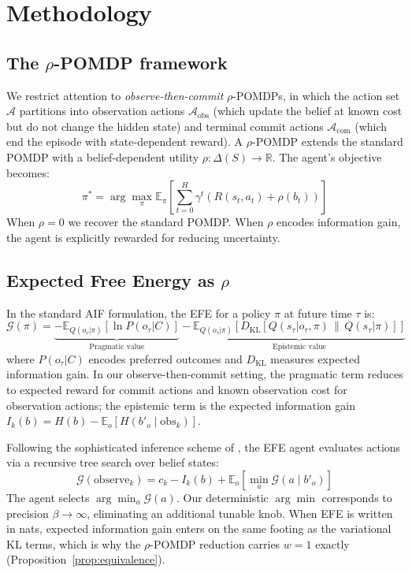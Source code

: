 \documentclass[runningheads]{llncs}
\begin{document}
\section{Methodology}
\label{sec:methodology}

\subsection{The $\rho$-POMDP framework}

We restrict attention to \emph{observe-then-commit} $\rho$-POMDPs, in which the action set $\mathcal{A}$ partitions into observation actions $\mathcal{A}_\text{obs}$ (which update the belief at known cost but do not change the hidden state) and terminal commit actions $\mathcal{A}_\text{com}$ (which end the episode with state-dependent reward). A $\rho$-POMDP extends the standard POMDP with a belief-dependent utility $\rho : \Delta(S) \rightarrow \mathbb{R}$. The agent's objective becomes:
\begin{equation}
    \pi^* = \arg\max_\pi \mathbb{E}_\pi \left[ \sum_{t=0}^{H} \gamma^t \left( R(s_t, a_t) + \rho(b_t) \right) \right]
\end{equation}
When $\rho = 0$ we recover the standard POMDP. When $\rho$ encodes information gain, the agent is explicitly rewarded for reducing uncertainty.

\subsection{Expected Free Energy as $\rho$}

In the standard AIF formulation, the EFE for a policy $\pi$ at future time $\tau$ is:
\begin{equation}
    \mathcal{G}(\pi) = \underbrace{- \mathbb{E}_{Q(o_\tau|\pi)}[\ln P(o_\tau|C)]}_{\text{Pragmatic value}} - \underbrace{\mathbb{E}_{Q(o_\tau|\pi)}\left[D_{\mathrm{KL}}\left[Q(s_\tau|o_\tau, \pi) \,\|\, Q(s_\tau|\pi)\right]\right]}_{\text{Epistemic value}}
\end{equation}
where $P(o_\tau|C)$ encodes preferred outcomes and $D_{\mathrm{KL}}$ measures expected information gain. In our observe-then-commit setting, the pragmatic term reduces to expected reward for commit actions and known observation cost for observation actions; the epistemic term is the expected information gain $I_k(b) = H(b) - \mathbb{E}_o[H(b'_o \mid \text{obs}_k)]$.

Following the sophisticated inference scheme of \citet{friston2021}, the EFE agent evaluates actions via a recursive tree search over belief states:
\begin{equation}
    \mathcal{G}(\text{observe}_k) = c_k - I_k(b) + \mathbb{E}_{o}\!\left[\min_a \mathcal{G}(a \mid b'_o)\right]
    \label{eq:efe_recursive}
\end{equation}
The agent selects $\arg\min_a \mathcal{G}(a)$. Our deterministic $\arg\min$ corresponds to precision $\beta \to \infty$, eliminating an additional tunable knob. When EFE is written in nats, expected information gain enters on the same footing as the variational KL terms, which is why the $\rho$-POMDP reduction carries $w{=}1$ exactly (Proposition~\ref{prop:equivalence}).
\end{document}
